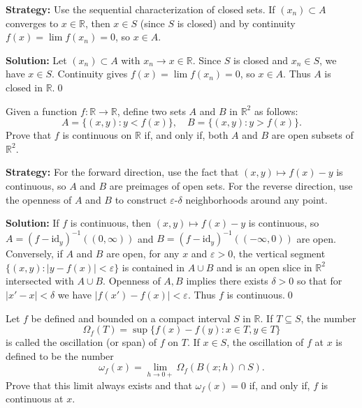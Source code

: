\noindent\textbf{Strategy:} Use the sequential characterization of closed sets. If $(x_n) \subset A$ converges to $x \in \mathbb{R}$, then $x \in S$ (since $S$ is closed) and by continuity $f(x) = \lim f(x_n) = 0$, so $x \in A$.

\bigskip\noindent\textbf{Solution:}
Let $(x_n)\subset A$ with $x_n\to x\in\mathbb{R}$. Since $S$ is closed and $x_n\in S$, we have $x\in S$. Continuity gives $f(x)=\lim f(x_n)=0$, so $x\in A$. Thus $A$ is closed in $\mathbb{R}$.\qed



\begin{problembox}
\begin{problemstatement}
Given a function \( f: \mathbb{R} \to \mathbb{R} \), define two sets \( A \) and \( B \) in \( \mathbb{R}^2 \) as follows:
\[A = \{(x, y) : y < f(x)\}, \quad B = \{(x, y) : y > f(x)\}.\]
Prove that \( f \) is continuous on \( \mathbb{R} \) if, and only if, both \( A \) and \( B \) are open subsets of \( \mathbb{R}^2 \).
\end{problemstatement}
\end{problembox}

\noindent\textbf{Strategy:} For the forward direction, use the fact that $(x,y) \mapsto f(x) - y$ is continuous, so $A$ and $B$ are preimages of open sets. For the reverse direction, use the openness of $A$ and $B$ to construct $\varepsilon$-$\delta$ neighborhoods around any point.

\bigskip\noindent\textbf{Solution:}
If $f$ is continuous, then $(x,y)\mapsto f(x)-y$ is continuous, so $A=(f-\mathrm{id}_y)^{-1}((0,\infty))$ and $B=(f-\mathrm{id}_y)^{-1}(({-}\infty,0))$ are open. Conversely, if $A$ and $B$ are open, for any $x$ and $\varepsilon>0$, the vertical segment $\{(x,y):|y-f(x)|<\varepsilon\}$ is contained in $A\cup B$ and is an open slice in $\mathbb{R}^2$ intersected with $A\cup B$. Openness of $A,B$ implies there exists $\delta>0$ so that for $|x'-x|<\delta$ we have $|f(x')-f(x)|<\varepsilon$. Thus $f$ is continuous.\qed



\begin{problembox}
\begin{problemstatement}
Let \( f \) be defined and bounded on a compact interval \( S \) in \( \mathbb{R} \). If \( T \subseteq S \), the number
\[\Omega_f(T) = \sup \{f(x) - f(y) : x \in T, y \in T\}\]
is called the oscillation (or span) of \( f \) on \( T \). If \( x \in S \), the oscillation of \( f \) at \( x \) is defined to be the number
\[\omega_f(x) = \lim_{h \to 0+} \Omega_f(B(x; h) \cap S).\]
Prove that this limit always exists and that \( \omega_f(x) = 0 \) if, and only if, \( f \) is continuous at \( x \).
\end{problemstatement}
\end{problembox}

